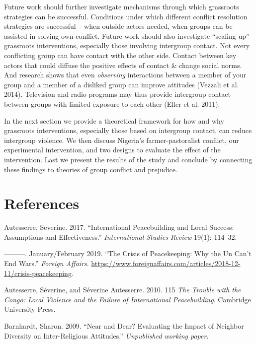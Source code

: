 \documentclass[11pt]{article}
\begin{document}
Future work should further investigate mechanisms through which
grassroots strategies can be successful. Conditions under which
different conflict resolution strategies are successful -- when outside
actors needed, when groups can be assisted in solving own conflict.
Future work should also investigate ``scaling up'' grassroots
interventions, especially those involving intergroup contact. Not every
conflicting group can have contact with the other side. Contact between
key actors that could diffuse the positive effects of contact \& change
social norms. And research shows that even \emph{observing} interactions
between a member of your group and a member of a disliked group can
improve attitudes (Vezzali et al. 2014). Television and radio programs
may thus provide intergroup contact between groups with limited exposure
to each other (Eller et al. 2011).

In the next section we provide a theoretical framework for how and why
grassroots interventions, especially those based on intergroup contact,
can reduce intergroup violence. We then discuss Nigeria's
farmer-pastoralist conflict, our experimental intervention, and two
designs to evaluate the effect of the intervention. Last we present the
results of the study and conclude by connecting these findings to
theories of group conflict and prejudice.

\section{References}\label{references}

\hypertarget{refs}{}
\hypertarget{ref-autesserre2017international}{}
Autesserre, Severine. 2017. ``International Peacebuilding and Local
Success: Assumptions and Effectiveness.'' \emph{International Studies
Review} 19(1): 114--32.

\hypertarget{ref-autesserre2019crisis}{}
---------. January/February 2019. ``The Crisis of Peacekeeping: Why the
Un Can't End Wars.'' \emph{Foreign Affairs}.
\url{https://www.foreignaffairs.com/articles/2018-12-11/crisis-peacekeeping}.

\hypertarget{ref-autesserre2010trouble}{}
Autesserre, Séverine, and Séverine Autesserre. 2010. 115 \emph{The
Trouble with the Congo: Local Violence and the Failure of International
Peacebuilding}. Cambridge University Press.

\hypertarget{ref-barnhardt2009near}{}
Barnhardt, Sharon. 2009. ``Near and Dear? Evaluating the Impact of
Neighbor Diversity on Inter-Religious Attitudes.'' \emph{Unpublished
working paper}.
\end{document}
